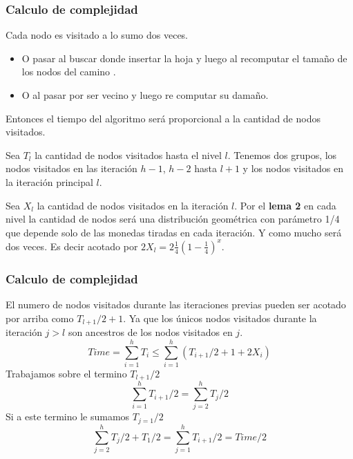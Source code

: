 \documentclass[10pt]{beamer}
\begin{document}
\begin{frame}
\frametitle{Calculo de complejidad}



Cada nodo es visitado a lo sumo dos veces.\pause
\begin{itemize}
  \item  O pasar al buscar donde insertar la hoja y luego al recomputar el tama\~no de los nodos del camino .
  \item O al pasar por ser vecino y luego re computar su dama\~no.
\end{itemize}

\pause
Entonces el tiempo del algoritmo será proporcional a la cantidad de nodos visitados.

\pause
Sea $T_l$ la cantidad de nodos visitados hasta el nivel $l$.
Tenemos dos grupos, los nodos  visitados en las iteración $h-1$, $h-2$ hasta $l+1$ y los nodos
visitados en la iteración principal $l$.

\pause
Sea $X_l$ la cantidad de nodos visitados en la iteración $l$.
Por el \textbf{lema 2} en cada nivel la cantidad de nodos será una distribución geométrica con parámetro 1/4 que
depende solo de las monedas tiradas en cada iteración.
Y como mucho será dos veces.
Es decir acotado por $2X_l=2 \frac{1}{4}(1-\frac{1}{4})^x$.

\end{frame}

\begin{frame}
\frametitle{Calculo de complejidad}

El numero de nodos visitados durante las iteraciones previas pueden ser acotado por arriba como $T_{l+1}/2 +1$.
Ya que los únicos  nodos visitados durante la iteración $j>l$ son ancestros de los nodos visitados en $j$.
\pause
\begin{equation*}
  Time = \sum_{i=1}^h T_i\leq \sum_{i=1}^h (T_{i+1}/2 +1 + 2X_i)
\end{equation*}
Trabajamos sobre el termino $T_{l+1}/2$
\begin{equation*}
  \sum_{i=1}^h T_{i+1}/2 = \sum_{j=2}^h T_j/2
\end{equation*}
Si a este termino le sumamos $T_{j=1}/2$
\begin{equation*}
  \sum_{j=2}^h T_j/2 + T_1/2 =  \sum_{j=1}^h T_{i+1}/2 = Time/2
\end{equation*}

\end{frame}
\end{document}
